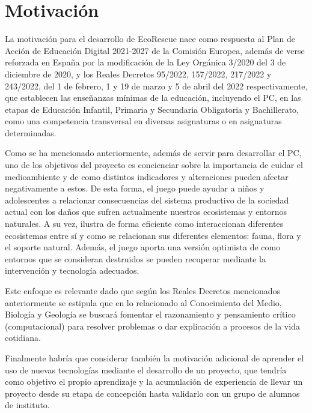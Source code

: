 \section{Motivación}

La motivación para el desarrollo de EcoRescue nace como respuesta al Plan de Acción de Educación Digital 2021-2027 de la Comisión Europea\cite{europaPlan}, además de verse reforzada en 
España por la modificación de la Ley Orgánica 3/2020 del 3 de diciembre de 2020\cite{lomce}, y los Reales Decretos 95/2022\cite{boeInfantil}, 157/2022\cite{boePrimaria}, 217/2022\cite{boeSecundaria} y 243/2022\cite{boebachillerato}, del 1 de febrero, 1 y 19 de marzo y 5 de abril del 2022 respectivamente, 
que establecen las enseñanzas mínimas de la educación, incluyendo el PC, en las etapas de Educación Infantil, Primaria y Secundaria Obligatoria y Bachillerato, como una competencia transversal en diversas asignaturas o en asignaturas determinadas.

Como se ha mencionado anteriormente, además de servir para desarrollar el PC, uno de los objetivos del proyecto es concienciar sobre la importancia de cuidar el medioambiente y de como distintos indicadores y alteraciones pueden afectar negativamente a estos. De esta forma, el juego puede ayudar a niños y adolescentes a relacionar consecuencias del sistema productivo de la sociedad actual con los daños que sufren actualmente nuestros ecosistemas y entornos naturales. A su vez, ilustra de forma eficiente como interaccionan diferentes ecosistemas entre sí y como se relacionan sus diferentes elementos: fauna, flora y el soporte natural. Además, el juego aporta una versión optimista de como entornos que se consideran destruidos se pueden recuperar mediante la intervención y tecnología adecuados. 

Este enfoque es relevante dado que según los Reales Decretos mencionados anteriormente\cite{boeInfantil}\cite{boePrimaria}\cite{boeSecundaria}\cite{boebachillerato} se estipula que en lo relacionado al Conocimiento del Medio, Biología y Geología se buscará fomentar el razonamiento y pensamiento crítico (computacional) para resolver problemas o dar explicación a procesos de la vida cotidiana.

Finalmente habría que considerar también la motivación adicional de aprender el uso de nuevas tecnologías mediante el desarrollo de un proyecto, que tendría como objetivo el propio aprendizaje y la acumulación de experiencia de llevar un proyecto desde su etapa de concepción hasta validarlo con un grupo de alumnos de instituto.


